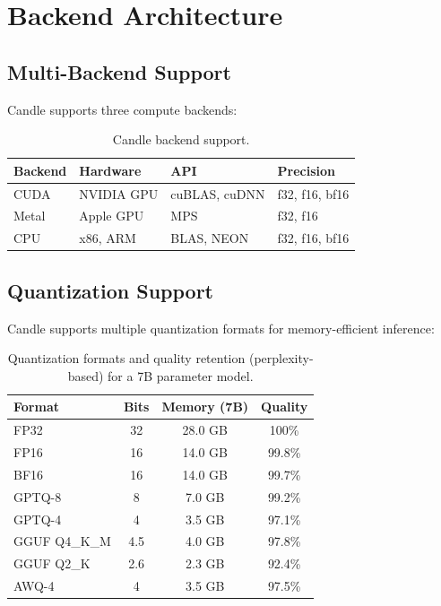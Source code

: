 \section{Backend Architecture}

\label{sec:backends}

\subsection{Multi-Backend Support}

Candle supports three compute backends:

\begin{table}[H]
\centering
\small
\begin{tabular}{llll}
\toprule
\textbf{Backend} & \textbf{Hardware} & \textbf{API} & \textbf{Precision} \\
\midrule
CUDA & NVIDIA GPU & cuBLAS, cuDNN & f32, f16, bf16 \\
Metal & Apple GPU & MPS & f32, f16 \\
CPU & x86, ARM & BLAS, NEON & f32, f16, bf16 \\
\bottomrule
\end{tabular}
\caption{Candle backend support.}
\label{tab:backends}
\end{table}

\subsection{Quantization Support}

Candle supports multiple quantization formats for memory-efficient inference:

\begin{table}[H]
\centering
\small
\begin{tabular}{lccc}
\toprule
\textbf{Format} & \textbf{Bits} & \textbf{Memory (7B)} & \textbf{Quality} \\
\midrule
FP32 & 32 & 28.0 GB & 100\% \\
FP16 & 16 & 14.0 GB & 99.8\% \\
BF16 & 16 & 14.0 GB & 99.7\% \\
GPTQ-8 & 8 & 7.0 GB & 99.2\% \\
GPTQ-4 & 4 & 3.5 GB & 97.1\% \\
GGUF Q4\_K\_M & 4.5 & 4.0 GB & 97.8\% \\
GGUF Q2\_K & 2.6 & 2.3 GB & 92.4\% \\
AWQ-4 & 4 & 3.5 GB & 97.5\% \\
\bottomrule
\end{tabular}
\caption{Quantization formats and quality retention (perplexity-based) for a 7B parameter model.}
\label{tab:quantization}
\end{table}

